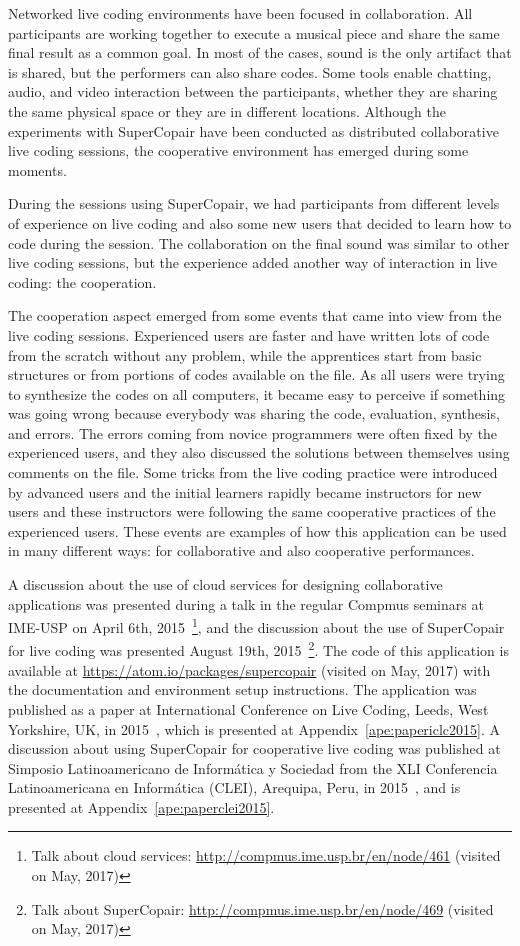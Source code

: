 Networked live coding environments have been focused in collaboration.
All participants are working together to execute a musical piece and share the same final result as a common goal.
In most of the cases, sound is the only artifact that is shared, but the performers can also share codes.
Some tools enable chatting, audio, and video interaction between the participants, whether they are sharing the same physical space or they are in different locations.
Although the experiments with SuperCopair have been conducted as distributed collaborative live coding sessions, the cooperative environment has emerged during some moments.

During the sessions using SuperCopair, we had participants from different levels of experience on live coding and also some new users that decided to learn how to code during the session.
The collaboration on the final sound was similar to other live coding sessions, but the experience added another way of interaction in live coding: the cooperation. 

The cooperation aspect emerged from some events that came into view from the live coding sessions.
Experienced users are faster and have written lots of code from the scratch without any problem, while the apprentices start from basic structures or from portions of codes available on the file.
As all users were trying to synthesize the codes on all computers, it became easy to perceive if something was going wrong because everybody was sharing the code, evaluation, synthesis, and errors.
The errors coming from novice programmers were often fixed by the experienced users, and they also discussed the solutions between themselves using comments on the file.
Some tricks from the live coding practice were introduced by advanced users and the initial learners rapidly became instructors for new users and these instructors were following the same cooperative practices of the experienced users.
These events are examples of how this application can be used in many different ways: for collaborative and also cooperative performances.

A discussion about the use of cloud services for designing collaborative applications was presented during a talk in the regular Compmus seminars at IME-USP on April 6th, 2015~\footnote{Talk about cloud services: \url{http://compmus.ime.usp.br/en/node/461} (visited on May, 2017)}, and the discussion about the use of SuperCopair for live coding was presented August 19th, 2015~\footnote{Talk about SuperCopair: \url{http://compmus.ime.usp.br/en/node/469} (visited on May, 2017)}.
The code of this application is available at \url{https://atom.io/packages/supercopair} (visited on May, 2017) with the documentation and environment setup instructions.
The application was published as a paper at International Conference on Live Coding, Leeds, West Yorkshire, UK, in 2015~\citep{deCarvalhoJunior2015supercopair}, which is presented at Appendix~\ref{ape:papericlc2015}.
A discussion about using SuperCopair for cooperative live coding was published at Simposio Latinoamericano de Informática y Sociedad from the XLI Conferencia Latinoamericana en Informática (CLEI), Arequipa, Peru, in 2015~\citep{deCarvalhoJunior2015cooperative}, and is presented at Appendix~\ref{ape:paperclei2015}.

